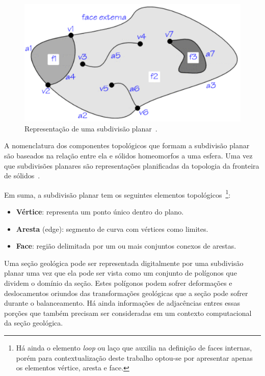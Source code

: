 \begin{figure} [h]
  \begin{center}
    \includegraphics[width=\textwidth]{images/fig-subdivisao-planar-2}
    \caption{Representação de uma subdivisão planar~\cite{Ferraz}.}\label{fig-subdivisao-planar-2}
  \end{center}
\end{figure}

A nomenclatura dos componentes topológicos que formam a subdivisão planar são baseados na relação entre ela e sólidos homeomorfos a uma esfera. Uma vez que subdivisões planares são representações planificadas da topologia da fronteira de sólidos~\cite{Cavalcanti}.

Em suma, a subdivisão planar tem os seguintes elementos topológicos~\footnote{Há ainda o elemento \emph{loop} ou laço que auxilia na definição de faces internas, porém para contextualização deste trabalho optou-se por apresentar apenas os elementos vértice, aresta e face.}:
\renewcommand{\labelitemi}{•}
\begin{itemize}
  \item \textbf{Vértice}: representa um ponto único dentro do plano.
  \item \textbf{Aresta} (edge): segmento de curva com vértices como limites.
  \item \textbf{Face}: região delimitada por um ou mais conjuntos conexos de arestas.
\end{itemize}

Uma seção geológica pode ser representada digitalmente por uma subdivisão planar uma vez que ela pode ser vista como um conjunto de polígonos que dividem o domínio da seção. Estes polígonos podem sofrer deformações e deslocamentos oriundos das transformações geológicas que a seção pode sofrer durante o balanceamento. Há ainda informações de adjacências entres essas porções que também precisam ser consideradas em um contexto computacional da seção geológica.


